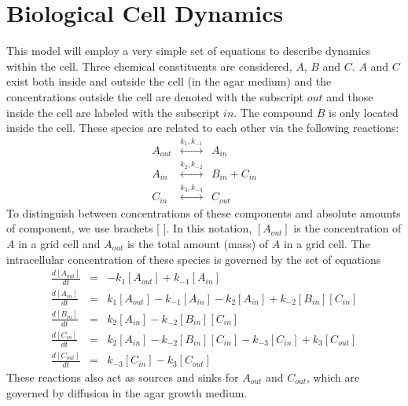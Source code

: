 \documentclass[12pt]{article}
\begin{document}
\section{Biological Cell Dynamics}
This model will employ a very simple set of equations to describe dynamics within the
cell. Three chemical constituents are considered, $A$, $B$ and $C$. $A$ and $C$ exist
both inside and outside the cell (in the agar medium) and the concentrations outside
the cell are denoted with the subscript $out$ and those inside the cell are labeled
with the subscript $in$. The compound $B$ is only located inside the cell.
These species are related to each other via the following reactions:
\begin{eqnarray*}
A_{out} &\stackrel{k_{1},k_{-1}}{\longleftrightarrow}& A_{in} \\
A_{in} &\stackrel{k_2,k_{-2}}{\longleftrightarrow}& B_{in} + C_{in} \\
C_{in} &\stackrel{k_3,k_{-3}}{\longleftrightarrow}& C_{out}
\end{eqnarray*}
To distinguish
between concentrations of these components and absolute amounts of component, we use
brackets [ ]. In this notation, $[A_{out}]$ is the concentration of $A$ in a grid cell and
$A_{out}$ is the total amount (mass) of $A$ in a grid cell.
The intracellular concentration of these species is governed by the set of equations
\begin{eqnarray*}
\frac{d [A_{out}]}{d t} &=&-k_1 [A_{out}]+k_{-1} [A_{in}] \\
\frac{d [A_{in}]}{d t} &=&k_1 [A_{out}]-k_{-1} [A_{in}] - k_2 [A_{in}]
 + k_{-2}[B_{in}][C_{in}]\\
\frac{d [B_{in}]}{d t} &=&k_2 [A_{in}] - k_{-2}[B_{in}][C_{in}]\\
\frac{d [C_{in}]}{d t} &=&k_2 [A_{in}] - k_{-2}[B_{in}][C_{in}]-k_{-3} [C_{in}]
+ k_3 [C_{out}] \\
\frac{d [C_{out}]}{d t} &=&k_{-3} [C_{in}]-k_3 [C_{out}]
\end{eqnarray*}
These reactions also act as sources and sinks for $A_{out}$ and $C_{out}$, which are governed
by diffusion in the agar growth medium.
\end{document}
